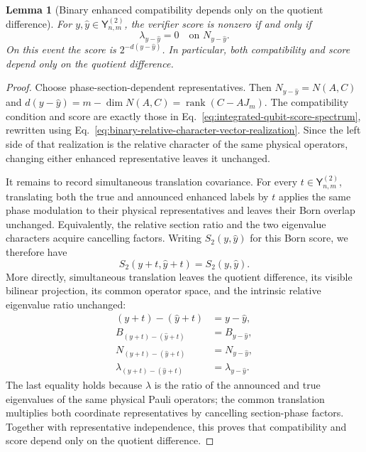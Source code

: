 \documentclass[11pt]{article}
\newcommand{\rank}{\operatorname{rank}}
\newcommand{\1}{\mathbf 1}
\theoremstyle{plain}
\newtheorem{lemma}[theorem]{Lemma}
\theoremstyle{definition}
\theoremstyle{remark}
\begin{document}
\begin{lemma}[Binary enhanced compatibility depends only on the quotient difference]
\label{lem:binary-enhanced-difference-compatibility}
For $y,\widehat y\in\mathsf Y_{n,m}^{(2)}$, the verifier score is nonzero if
and only if
\begin{equation}
 \lambda_{y-\widehat y}=0\quad\text{on }N_{y-\widehat y}.
 \label{eq:binary-enhanced-compatibility}
\end{equation}
On this event the score is
$2^{-d(y-\widehat y)}$.  In particular, both compatibility and score depend
only on the quotient difference.
\end{lemma}
\begin{proof}
Choose phase-section-dependent representatives.  Then
$N_{y-\widehat y}=N(A,C)$ and
$d(y-\widehat y)=m-\dim N(A,C)=\rank(C-AJ_m)$.  The compatibility condition
and score are exactly those in
Eq.~\eqref{eq:integrated-qubit-score-spectrum}, rewritten using
Eq.~\eqref{eq:binary-relative-character-vector-realization}.  Since the left
side of that realization is the relative character of the same physical
operators, changing either enhanced representative leaves it unchanged.

It remains to record simultaneous translation covariance.  For every
$t\in\mathsf Y_{n,m}^{(2)}$, translating both the true and announced enhanced
labels by $t$ applies the same phase modulation to their physical
representatives and leaves their Born overlap unchanged.  Equivalently, the
relative section ratio and the two eigenvalue characters acquire cancelling
factors.  Writing $S_2(y,\widehat y)$ for this Born score, we therefore have
\begin{equation}
 S_2(y+t,\widehat y+t)=S_2(y,\widehat y).
 \label{eq:binary-enhanced-simultaneous-translation-covariance}
\end{equation}
More directly, simultaneous translation leaves the quotient difference, its
visible bilinear projection, its common operator space, and the intrinsic
relative eigenvalue ratio unchanged:
\begin{equation}
 \begin{aligned}
 (y+t)-(\widehat y+t)&=y-\widehat y,\\
 B_{(y+t)-(\widehat y+t)}&=B_{y-\widehat y},\\
 N_{(y+t)-(\widehat y+t)}&=N_{y-\widehat y},\\
 \lambda_{(y+t)-(\widehat y+t)}&=\lambda_{y-\widehat y}.
 \end{aligned}
 \label{eq:binary-enhanced-relative-character-translation-invariance}
\end{equation}
The last equality holds because $\lambda$ is the ratio of the announced and
true eigenvalues of the same physical Pauli operators; the common translation
multiplies both coordinate representatives by cancelling section-phase
factors.  Together with representative independence, this proves that
compatibility and score depend only on the quotient difference.
\end{proof}
\end{document}

